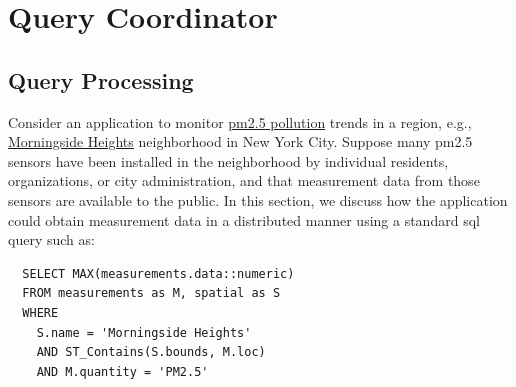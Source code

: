 \documentclass[conference,10pt]{IEEEtran}
\begin{document}



\section{Query Coordinator}\label{sec:query-coordinator}


\subsection{Query Processing}\label{sec:query-processing}

Consider an application to monitor \href{https://www.epa.gov/pm-pollution}{\gls{pm2.5} pollution} trends in a region, e.g., \href{https://www.openstreetmap.org/relation/8398079}{Morningside Heights} neighborhood in New York City. Suppose many \gls{pm2.5} sensors have been installed in the neighborhood by individual residents, organizations, or city administration, and that measurement data from those sensors are available to the public. In this section, we discuss how the application could obtain measurement data in a distributed manner using a standard \gls{sql}~\cite{sql} query such as:
\begin{verbatim}
  SELECT MAX(measurements.data::numeric)
  FROM measurements as M, spatial as S
  WHERE
    S.name = 'Morningside Heights'
    AND ST_Contains(S.bounds, M.loc)
    AND M.quantity = 'PM2.5'
\end{verbatim}
\end{document}
